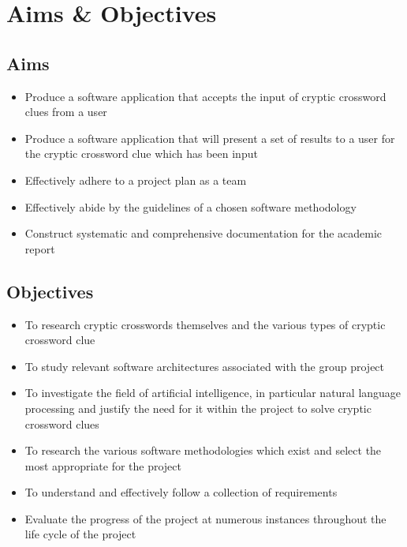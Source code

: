 \section{Aims \& Objectives}


\subsection{Aims}

\begin{itemize}
  \item Produce a software application that accepts the input of cryptic 
        crossword clues from a user
  \item Produce a software application that will present a set of results to a
        user for the cryptic crossword clue which has been input
  \item Effectively adhere to a project plan as a team
  \item Effectively abide by the guidelines of a chosen software methodology
  \item Construct systematic and comprehensive documentation for the academic
 report
\end{itemize}


\subsection{Objectives}

\begin{itemize}
  \item To research cryptic crosswords themselves and the various types of 
        cryptic crossword clue
  \item To study relevant software architectures associated with the group 
        project
  \item To investigate the field of artificial intelligence, in particular 
        natural language processing and justify the need for it within the 
        project to solve cryptic crossword clues
  \item To research the various software methodologies which exist and select 
        the most appropriate for the project
  \item To understand and effectively follow a collection of requirements
  \item Evaluate the progress of the project at numerous instances throughout 
        the life cycle of the project
\end{itemize}